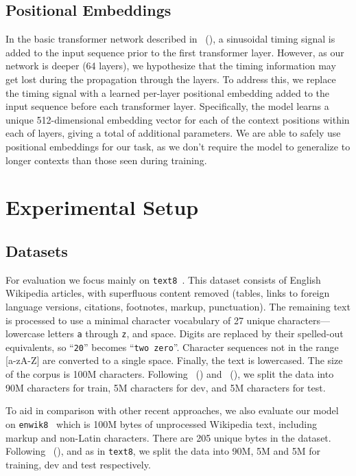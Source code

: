 \documentclass[letterpaper]{article}
\newcommand{\texteight}{\texttt{text8}}
\newcommand{\enwikeight}{\texttt{enwik8}}
\newcommand{\newcite}[1]{\citeauthor{#1}~(\citeyear{#1})}
\begin{document}
\subsection{Positional Embeddings}
\label{section:positional}
In the basic transformer network described in \newcite{NIPS2017_7181}, a sinusoidal timing signal is added to the input sequence prior to the first transformer layer.
However, as our network is deeper (64 layers), we hypothesize that the timing information may get lost during the propagation through the layers.
To address this, we replace the timing signal with a learned per-layer positional embedding added to the input sequence before each transformer layer.
Specifically, the model learns a unique 512-dimensional embedding vector for each of the  context positions within each of  layers, giving a total of  additional parameters.
We are able to safely use positional embeddings for our task, as we don't require the model to generalize to longer contexts than those seen during training.

\section{Experimental Setup}
\subsection{Datasets}


For evaluation we focus mainly on \texteight{}~\cite{mahoney}.
This dataset consists of English Wikipedia articles, with superfluous content removed (tables, links to foreign language versions, citations, footnotes, markup, punctuation).
The remaining text is processed to use a minimal character vocabulary of 27 unique characters---lowercase letters \texttt{a} through \texttt{z}, and space.
Digits are replaced by their spelled-out equivalents, so ``\texttt{20}'' becomes ``\texttt{two zero}''.
Character sequences not in the range [a-zA-Z] are converted to a single space.
Finally, the text is lowercased.
The size of the corpus is 100M characters.
Following \newcite{mikolov2012subword} and \newcite{zhang2016architectural}, we split the data into 90M characters for train, 5M characters for dev, and 5M characters for test.

To aid in comparison with other recent approaches, we also evaluate our model on \enwikeight{}~\cite{mahoney} which is 100M bytes of unprocessed Wikipedia text, including markup and non-Latin characters.
There are 205 unique bytes in the dataset.
Following \newcite{chung2015gated}, and as in \texteight{}, we split the data into 90M, 5M and 5M for training, dev and test respectively.
\end{document}
